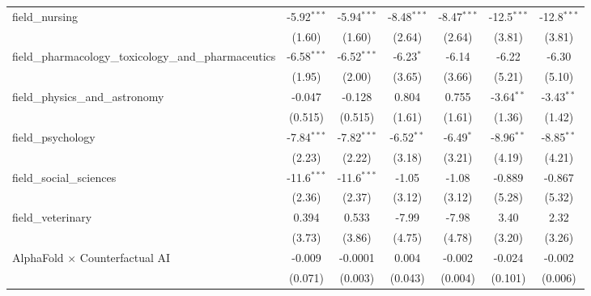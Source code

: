 \begin{tabular}{lcccccc}
   field\_nursing                                              & -5.92$^{***}$ & -5.94$^{***}$ & -8.48$^{***}$ & -8.47$^{***}$  & -12.5$^{***}$ & -12.8$^{***}$\\   
                                                               & (1.60)        & (1.60)        & (2.64)        & (2.64)         & (3.81)        & (3.81)\\   
   field\_pharmacology\_toxicology\_and\_pharmaceutics         & -6.58$^{***}$ & -6.52$^{***}$ & -6.23$^{*}$   & -6.14          & -6.22         & -6.30\\   
                                                               & (1.95)        & (2.00)        & (3.65)        & (3.66)         & (5.21)        & (5.10)\\   
   field\_physics\_and\_astronomy                              & -0.047        & -0.128        & 0.804         & 0.755          & -3.64$^{**}$  & -3.43$^{**}$\\   
                                                               & (0.515)       & (0.515)       & (1.61)        & (1.61)         & (1.36)        & (1.42)\\   
   field\_psychology                                           & -7.84$^{***}$ & -7.82$^{***}$ & -6.52$^{**}$  & -6.49$^{*}$    & -8.96$^{**}$  & -8.85$^{**}$\\   
                                                               & (2.23)        & (2.22)        & (3.18)        & (3.21)         & (4.19)        & (4.21)\\   
   field\_social\_sciences                                     & -11.6$^{***}$ & -11.6$^{***}$ & -1.05         & -1.08          & -0.889        & -0.867\\   
                                                               & (2.36)        & (2.37)        & (3.12)        & (3.12)         & (5.28)        & (5.32)\\   
   field\_veterinary                                           & 0.394         & 0.533         & -7.99         & -7.98          & 3.40          & 2.32\\   
                                                               & (3.73)        & (3.86)        & (4.75)        & (4.78)         & (3.20)        & (3.26)\\   
   AlphaFold $\times$ Counterfactual AI                        & -0.009        & -0.0001       & 0.004         & -0.002         & -0.024        & -0.002\\   
                                                               & (0.071)       & (0.003)       & (0.043)       & (0.004)        & (0.101)       & (0.006)\\   

\end{tabular}
